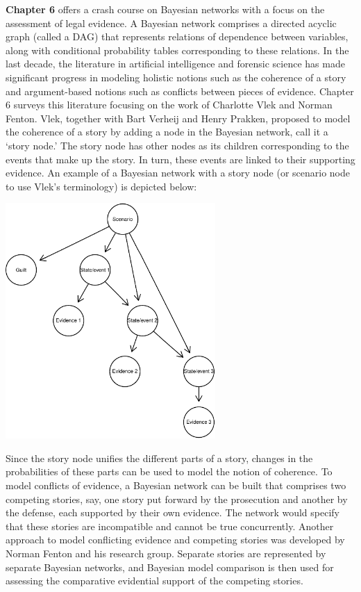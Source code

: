 \documentclass[
  10pt,
  dvipsnames,enabledeprecatedfontcommands]{scrartcl}
\begin{document}
\textbf{Chapter 6} offers a crash course on Bayesian networks with a
focus on the assessment of legal evidence. A Bayesian network comprises
a directed acyclic graph (called a DAG) that represents relations of
dependence between variables, along with conditional probability tables
corresponding to these relations. In the last decade, the literature in
artificial intelligence and forensic science has made significant
progress in modeling holistic notions such as the coherence of a story
and argument-based notions such as conflicts between pieces of evidence.
Chapter 6 surveys this literature focusing on the work of Charlotte Vlek
and Norman Fenton. Vlek, together with Bart Verheij and Henry Prakken,
proposed to model the coherence of a story by adding a node in the
Bayesian network, call it a `story node.' The story node has other nodes
as its children corresponding to the events that make up the story. In
turn, these events are linked to their supporting evidence. An example
of a Bayesian network with a story node (or scenario node to use Vlek's
terminology) is depicted below:

\begin{center}
\includegraphics[width=8cm]{vlek-scenario-node.pdf}
 \end{center}

Since the story node unifies the different parts of a story, changes in
the probabilities of these parts can be used to model the notion of
coherence. To model conflicts of evidence, a Bayesian network can be
built that comprises two competing stories, say, one story put forward
by the prosecution and another by the defense, each supported by their
own evidence. The network would specify that these stories are
incompatible and cannot be true concurrently. Another approach to model
conflicting evidence and competing stories was developed by Norman
Fenton and his research group. Separate stories are represented by
separate Bayesian networks, and Bayesian model comparison is then used
for assessing the comparative evidential support of the competing
stories.
\end{document}
